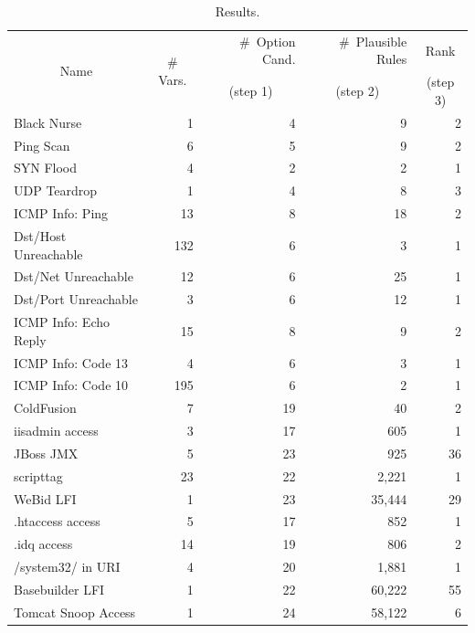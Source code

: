 \documentclass[conference]{IEEEtran}
\begin{document}
\begin{table}[t!]
  \footnotesize
  \setlength{\tabcolsep}{2pt}
  \renewcommand{\arraystretch}{0.5}
  \caption{\label{table:results}Results.}
  \vspace{-2ex}
  \centering
  \begin{tabular}{lrrrr}
    \toprule
    \multicolumn{1}{c}{\multirow{2}{*}{Name}} &
    \multicolumn{1}{c}{\multirow{2}{*}{\# Vars.}} &
    \#~Option Cand. &
    \#~Plausible Rules &    
    \multicolumn{1}{c}{Rank} \\

     &
    \multicolumn{1}{c}{} &
    \multicolumn{1}{c}{(step 1)} &
    \multicolumn{1}{c}{(step 2)} &    
    \multicolumn{1}{c}{(step 3)} \\

    \midrule
    Black Nurse & 1 & 4 & 9 & 2 \\    
    Ping Scan & 6 & 5 & 9 & 2 \\
    SYN Flood & 4 & 2 & 2 & 1 \\
    UDP Teardrop & 1 & 4 & 8 & 3 \\
    ICMP Info: Ping & 13 & 8 & 18 & 2 \\
    Dst/Host Unreachable & 132 & 6 & 3 & 1 \\
    Dst/Net Unreachable & 12 & 6 & 25 & 1 \\
    Dst/Port Unreachable & 3 & 6 & 12 & 1 \\
    ICMP Info: Echo Reply & 15 & 8 & 9 & 2 \\
    ICMP Info: Code 13 & 4 & 6 & 3 & 1 \\
    ICMP Info: Code 10 & 195 & 6 & 2 & 1 \\
    \midrule
    ColdFusion & 7 & 19 & 40 & 2\\
    iisadmin access & 3 & 17 & 605 & 1 \\        
    JBoss JMX & 5 & 23 & 925 & 36 \\
    scripttag & 23 & 22 & 2,221 & 1 \\
    WeBid LFI & 1 & 23 & 35,444 & 29\\    
    .htaccess access & 5 & 17 & 852 & 1\\
    .idq access & 14 & 19 & 806 & 2 \\
    /system32/ in URI & 4 & 20 & 1,881 & 1 \\
    Basebuilder LFI & 1 & 22 & 60,222 & 55 \\
    Tomcat Snoop Access & 1 & 24 & 58,122 & 6 \\
    \bottomrule
  \end{tabular}
\end{table}
\end{document}
